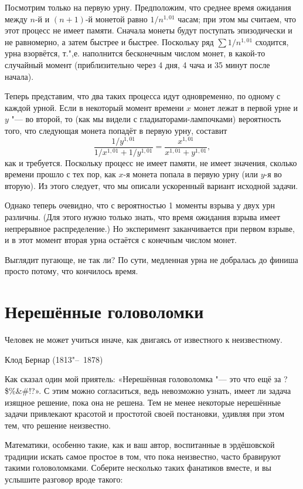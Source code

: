 \documentclass[twoside]{book}
\begin{document}
\medskip

Посмотрим только на первую урну.
Предположим, что среднее время ожидания между $n$-й и $(n+1)$-й монетой равно 
$1/n^{1{,}01}$ часам; при этом мы считаем, что этот процесс не имеет памяти.
Сначала монеты будут поступать эпизодически и не равномерно, а затем быстрее и быстрее.
Поскольку ряд $\sum 1/n^{1{,}01}$ сходится, урна взорвётся, т.",е. наполнится бесконечным числом монет, в какой-то случайный момент (приблизительно через 4 дня, 4 чача и 35 минут после начала).

Теперь представим, что два таких процесса идут одновременно, по одному с каждой урной.
Если в некоторый момент времени $x$ монет лежат в первой урне и $y$ "--- во второй, то (как мы видели с гладиаторами-лампочками) 
вероятность того, что следующая монета попадёт в первую урну, составит
\[\frac{1/y^{1{,}01}}{1/x^{1{,}01}+1/y^{1{,}01}}=\frac{x^{1{,}01}}{x^{1{,}01}+y^{1{,}01}},\]
как и требуется.
Поскольку процесс не имеет памяти,
не имеет значения, сколько времени прошло с тех пор, как $x$-я монета попала в первую урну (или $y$-я во вторую).
Из этого следует, что мы описали ускоренный вариант исходной задачи.

Однако теперь очевидно, что с вероятностью 1 моменты взрыва у двух урн различны.
(Для этого нужно только знать, что время ожидания взрыва имеет непрерывное распределение.)
Но эксперимент заканчивается при первом взрыве, и в этот момент вторая урна остаётся с конечным числом монет.\heart

Выглядит пугающе, не так ли?
По сути, медленная урна не добралась до финиша просто потому, что кончилось время.

\chapter{Нерешённые головоломки}

\setlength{\epigraphwidth}{.55\textwidth}
\epigraph{Человек не может учиться иначе, как двигаясь от известного к неизвестному.\vspace{1ex}}{Клод Бернар (1813"--~1878)}

Как сказал один мой приятель: «Нерешённая головоломка "--- это что ещё за ?\$\%\&\#\@!?».
С этим можно согласиться, ведь невозможно узнать, имеет ли задача изящное решение, пока она не решена.
Тем не менее некоторые нерешённые задачи привлекают красотой и простотой своей постановки, удивляя при этом тем, что решение неизвестно.

Математики, особенно такие, как и ваш автор, воспитанные в эрдёшовской традиции искать самое простое в том, что пока неизвестно, часто бравируют такими головоломками.
Соберите несколько таких фанатиков вместе, и вы услышите разговор вроде такого:
\end{document}

